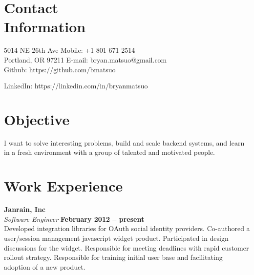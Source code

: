 \documentclass[margin,line]{resume}
\begin{document}
\begin{resume}

    \section{\mysidestyle Contact\\Information}

    5014 NE 26th Ave    \hfill Mobile: +1 801 671 2514                        \vspace{0mm}\\\vspace{0mm}%
    Portland, OR 97211  \hfill E-mail: bryan.matsuo@gmail.com                 \vspace{0mm}\\\vspace{-4.5mm}%
                        \hfill Github: https://github.com/bmatsuo             \vspace{0mm}\\\vspace{-4.5mm}%

                        \hfill LinkedIn: https://linkedin.com/in/bryanmatsuo  \vspace{0mm}\\\vspace{-4.5mm}%
        


    \section{\mysidestyle Objective}

    I want to solve interesting problems, build and scale backend systems,
    and learn in a fresh environment with a group of talented and motivated
    people.

    \section{\mysidestyle Work Experience}

    \textbf{Janrain, Inc} \vspace{2mm}\\\vspace{1mm}%
    \textsl{Software Engineer} \hfill \textbf{February 2012 -- present}\\
    Developed integration libraries for OAuth social identity
    providers. Co-authored a user/session management javascript widget
    product. Participated in design discussions for the widget. Responsible
    for meeting deadlines with rapid customer rollout strategy. Responsible
    for training initial user base and facilitating adoption of a new product.


\end{resume}
\end{document}

